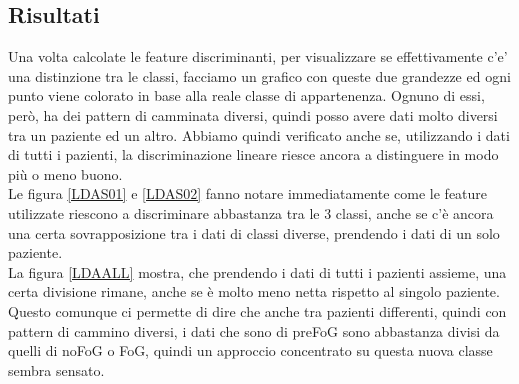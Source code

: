 \subsection{Risultati}
Una volta calcolate le feature discriminanti, per visualizzare se effettivamente c'e' una distinzione tra le classi, facciamo un grafico con queste due grandezze ed ogni punto viene colorato in base alla reale classe di appartenenza. Ognuno di essi, però, ha dei pattern di camminata diversi, quindi posso avere dati molto diversi tra un paziente ed un altro. Abbiamo quindi verificato anche se, utilizzando i dati di tutti i pazienti, la discriminazione lineare riesce ancora a distinguere in modo più o meno buono.\\
Le figura \ref{LDAS01} e \ref{LDAS02} fanno notare immediatamente come le feature utilizzate riescono a discriminare abbastanza tra le 3 classi, anche se c'è ancora una certa sovrapposizione tra i dati di classi diverse, prendendo i dati di un solo paziente.\\
La figura \ref{LDAALL} mostra, che prendendo i dati di tutti i pazienti assieme, una certa divisione rimane, anche se è molto meno netta rispetto al singolo paziente. Questo comunque ci permette di dire che anche tra pazienti differenti, quindi con pattern di cammino diversi, i dati che sono di preFoG sono abbastanza divisi da quelli di noFoG o FoG, quindi un approccio concentrato su questa nuova classe sembra sensato.

